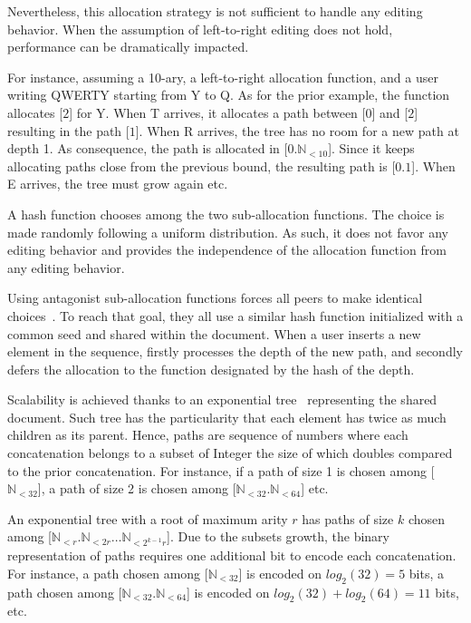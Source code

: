 \begin{asparadesc}
  Nevertheless, this allocation strategy is not sufficient to handle any editing
  behavior. When the assumption of left-to-right editing does not hold,
  performance can be dramatically impacted.

  For instance, assuming a 10-ary, a left-to-right allocation function, and a
  user writing QWERTY starting from Y to Q. As for the prior example, the
  function allocates [$2$] for Y. When T arrives, it allocates a path between
  [$0$] and [$2$] resulting in the path [$1$]. When R arrives, the tree has no
  room for a new path at depth 1. As consequence, the path is allocated in
  [$0.\mathbb{N}_{<10}$]. Since it keeps allocating paths close from the
  previous bound, the resulting path is [$0.1$]. When E arrives, the tree must
  grow again etc.

  A hash function chooses among the two sub-allocation functions. The choice is
  made randomly following a uniform distribution. As such, it does not favor any
  editing behavior and provides the independence of the allocation function from
  any editing behavior.

  Using antagonist sub-allocation functions forces all peers to make identical
  choices~\cite{nedelec2013concurrency}. To reach that goal, they all use a
  similar hash function initialized with a common seed and shared within the
  document. When a user inserts a new element in the sequence, \LSEQ firstly
  processes the depth of the new path, and secondly defers the allocation to the
  function designated by the hash of the depth.

\item [Scalability] is achieved thanks to an exponential
  tree~\cite{andersson1996faster, andersson2007dynamic} representing the shared
  document. Such tree has the particularity that each element has twice as much
  children as its parent.  Hence, paths are sequence of numbers where each
  concatenation belongs to a subset of Integer the size of which doubles
  compared to the prior concatenation. For instance, if a path of size 1 is
  chosen among [$\mathbb{N}_{<32}$], a path of size 2 is chosen among
  [$\mathbb{N}_{<32}.\mathbb{N}_{<64}$] etc.

  An exponential tree with a root of maximum arity $r$ has paths of size $k$
  chosen among [$\mathbb{N}_{<r}.\mathbb{N}_{<2r}\ldots\mathbb{N}_{<2^{k-1}r}$].
  Due to the subsets growth, the binary representation of paths requires one
  additional bit to encode each concatenation. For instance, a path chosen among
  [$\mathbb{N}_{<32}$] is encoded on $log_2(32)=5$ bits, a path chosen among
  [$\mathbb{N}_{<32}.\mathbb{N}_{<64}$] is encoded on $log_2(32)+log_2(64)=11$
  bits, etc.
  

\end{asparadesc}
